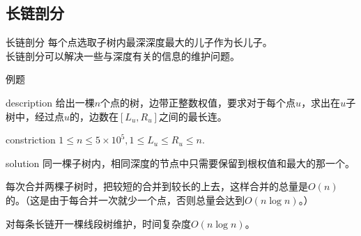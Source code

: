 \documentclass{beamer}
\begin{document}
	\subsection{长链剖分}
	\begin{frame}{长链剖分}
		每个点选取子树内最深深度最大的儿子作为长儿子。\\
		
		长链剖分可以解决一些与深度有关的信息的维护问题。
	\end{frame}
	\begin{frame}{例题}
		\begin{block}{description}
			给出一棵$n$个点的树，边带正整数权值，要求对于每个点$u$，求出在$u$子树中，经过点$u$的，边数在$[L_u,R_u]$之间的最长连。
		\end{block}
		\begin{block}{constriction}
			$1 \le n \le 5\times 10^5, 1 \le L_u \le R_u \le n.$
		\end{block}
		\pause
		\begin{block}{solution}
			同一棵子树内，相同深度的节点中只需要保留到根权值和最大的那一个。
			
			每次合并两棵子树时，把较短的合并到较长的上去，这样合并的总量是$O(n)$的。（这是由于每合并一次就少一个点，否则总量会达到$O(n\log n)$。）
			
			对每条长链开一棵线段树维护，时间复杂度$O(n\log n)$。
		\end{block}
	\end{frame}
\end{document}
